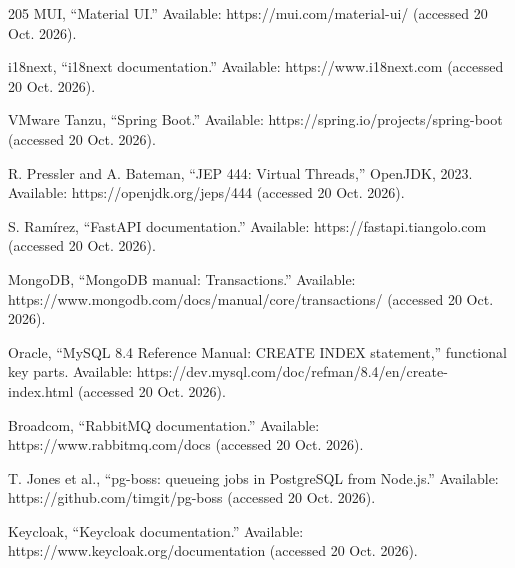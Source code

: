 \begin{thebibliography}{205}
 MUI, ``Material UI.'' Available: https:/\allowbreak{}/\allowbreak{}mui.\allowbreak{}com/\allowbreak{}material-\allowbreak{}ui/ (accessed 20 Oct. 2026).

 i18next, ``i18next documentation.\allowbreak{}'' Available: https:/\allowbreak{}/\allowbreak{}www.\allowbreak{}i18next.\allowbreak{}com (accessed 20 Oct. 2026).

 VMware Tanzu, ``Spring Boot.'' Available: https:/\allowbreak{}/\allowbreak{}spring.\allowbreak{}io/\allowbreak{}projects/\allowbreak{}spring-\allowbreak{}boot (accessed 20 Oct. 2026).

 R. Pressler and A. Bateman, ``JEP 444: Virtual Threads,'' OpenJDK, 2023. Available: https:/\allowbreak{}/\allowbreak{}openjdk.\allowbreak{}org/\allowbreak{}jeps/\allowbreak{}444 (accessed 20 Oct. 2026).

 S. Ramírez, ``FastAPI documentation.\allowbreak{}'' Available: https:/\allowbreak{}/\allowbreak{}fastapi.\allowbreak{}tiangolo.\allowbreak{}com (accessed 20 Oct. 2026).

 MongoDB, ``MongoDB manual: Transactions.\allowbreak{}'' Available: https:/\allowbreak{}/\allowbreak{}www.\allowbreak{}mongodb.\allowbreak{}com/\allowbreak{}docs/\allowbreak{}manual/\allowbreak{}core/\allowbreak{}transactions/ (accessed 20 Oct. 2026).

 Oracle, ``MySQL 8.4 Reference Manual: CREATE INDEX statement,'' functional key parts. Available: https:/\allowbreak{}/\allowbreak{}dev.\allowbreak{}mysql.\allowbreak{}com/\allowbreak{}doc/\allowbreak{}refman/\allowbreak{}8.\allowbreak{}4/\allowbreak{}en/\allowbreak{}create-\allowbreak{}index.\allowbreak{}html (accessed 20 Oct. 2026).

 Broadcom, ``RabbitMQ documentation.\allowbreak{}'' Available: https:/\allowbreak{}/\allowbreak{}www.\allowbreak{}rabbitmq.\allowbreak{}com/\allowbreak{}docs (accessed 20 Oct. 2026).

 T. Jones et al., ``pg-boss: queueing jobs in PostgreSQL from Node.js.'' Available: https:/\allowbreak{}/\allowbreak{}github.\allowbreak{}com/\allowbreak{}timgit/\allowbreak{}pg-\allowbreak{}boss (accessed 20 Oct. 2026).

 Keycloak, ``Keycloak documentation.\allowbreak{}'' Available: https:/\allowbreak{}/\allowbreak{}www.\allowbreak{}keycloak.\allowbreak{}org/\allowbreak{}documentation (accessed 20 Oct. 2026).


\end{thebibliography}
